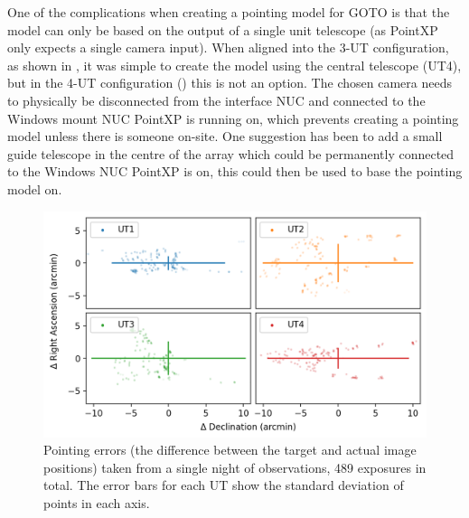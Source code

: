 \begin{colsection}
One of the complications when creating a pointing model for GOTO is that the model can only be based on the output of a single unit telescope (as PointXP only expects a single camera input). When aligned into the 3-UT configuration, as shown in , it was simple to create the model using the central telescope (UT4), but in the 4-UT configuration () this is not an option. The chosen camera needs to physically be disconnected from the interface NUC and connected to the Windows mount NUC PointXP is running on, which prevents creating a pointing model unless there is someone on-site. One suggestion has been to add a small guide telescope in the centre of the array which could be permanently connected to the Windows NUC PointXP is on, this could then be used to base the pointing model on.

\begin{figure}[t]
    \begin{center}
        \includegraphics[width=\linewidth]{images/pointing.png}
    \end{center}
    \caption[Pointing errors over a single night]{
        Pointing errors (the difference between the target and actual image positions) taken from a single night of observations, 489 exposures in total. The error bars for each UT show the standard deviation of points in each axis.
    }\label{fig:pointing}
\end{figure}


\end{colsection}

